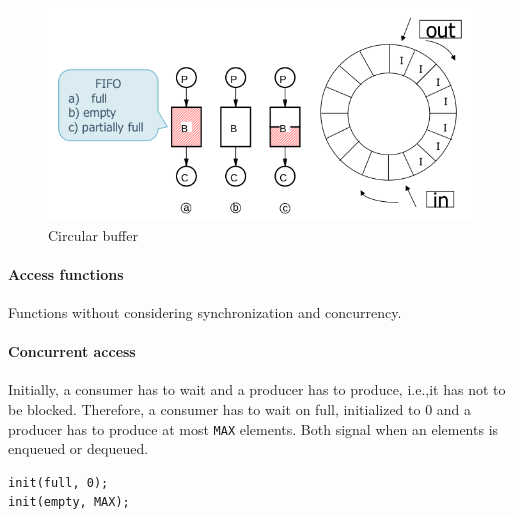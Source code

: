 \begin{figure}[hbtp]
\centering
\includegraphics[scale=0.4]{images/synchronization/producer_consumer_buffer.png}
\caption{Circular buffer}
\end{figure}

\paragraph{Access functions}
Functions without considering synchronization and concurrency.

\begin{Parallel}{}{}
\end{Parallel}

\paragraph{Concurrent access}
Initially, a consumer has to wait and a producer has to produce, i.e.,\@ it has not to be blocked. Therefore, a consumer has to wait on full, initialized to 0 and a producer has to produce at most \texttt{MAX} elements. Both signal when an elements is enqueued or dequeued.
\begin{verbatim}
init(full, 0);
init(empty, MAX);
\end{verbatim}

\begin{Parallel}{}{}
\end{Parallel}

